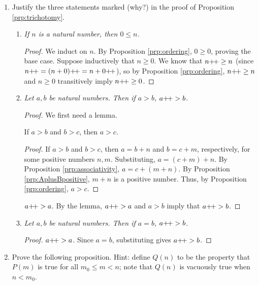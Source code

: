 \documentclass[../main.tex]{subfiles}
\begin{document}
\begin{enumerate}[ref={\thesection.\arabic*}]
\begin{prp}
\begin{enumerate}[label={\textup{(}\alph*\textup{)}}]
        \end{enumerate}
    \end{prp}
    \item \label{exr:2.2.4}Justify the three statements marked (why?) in the proof of Proposition \ref{prp:trichotomy}.
    \begin{enumerate}[label={(\alph*)},ref={2.2.4\alph*}]
        \item \label{exr:2.2.4a}\emph{If $n$ is a natural number, then $0\leq n$.}
        \begin{proof}
            We induct on $n$. By Proposition \ref{prp:ordering}, $0\geq 0$, proving the base case. Suppose inductively that $n\geq 0$. We know that $n{+\!+}\geq n$ (since $n{+\!+}=(n+0){+\!+}=n+0{+\!+}$), so by Proposition \ref{prp:ordering}, $n{+\!+}\geq n$ and $n\geq 0$ transitively imply $n{+\!+}\geq 0$.
        \end{proof}
        \item \label{exr:2.2.4b}\emph{Let $a,b$ be natural numbers. Then if $a>b$, $a{+\!+}>b$.}
        \begin{proof}
            We first need a lemma.
            \begin{lem}
                If $a>b$ and $b>c$, then $a>c$.
                \begin{proof}
                    If $a>b$ and $b>c$, then $a=b+n$ and $b=c+m$, respectively, for some positive numbers $n,m$. Substituting, $a=(c+m)+n$. By Proposition \ref{prp:associativity}, $a=c+(m+n)$. By Proposition \ref{prp:AplusBpositive}, $m+n$ is a positive number. Thus, by Proposition \ref{prp:ordering}, $a>c$.
                \end{proof}
            \end{lem}
            $a{+\!+}>a$. By the lemma, $a{+\!+}>a$ and $a>b$ imply that $a{+\!+}>b$.
        \end{proof}
        \item \label{exr:2.2.4c}\emph{Let $a,b$ be natural numbers. Then if $a=b$, $a{+\!+}>b$.}
        \begin{proof}
            $a{+\!+}>a$. Since $a=b$, substituting gives $a{+\!+}>b$.
        \end{proof}
    \end{enumerate}
    \item \label{exr:2.2.5}Prove the following proposition. Hint: define $Q(n)$ to be the property that $P(m)$ is true for all $m_0\leq m<n$; note that $Q(n)$ is vacuously true when $n<m_0$.
    \begin{prp}

\end{prp}
\end{enumerate}
\end{document}
